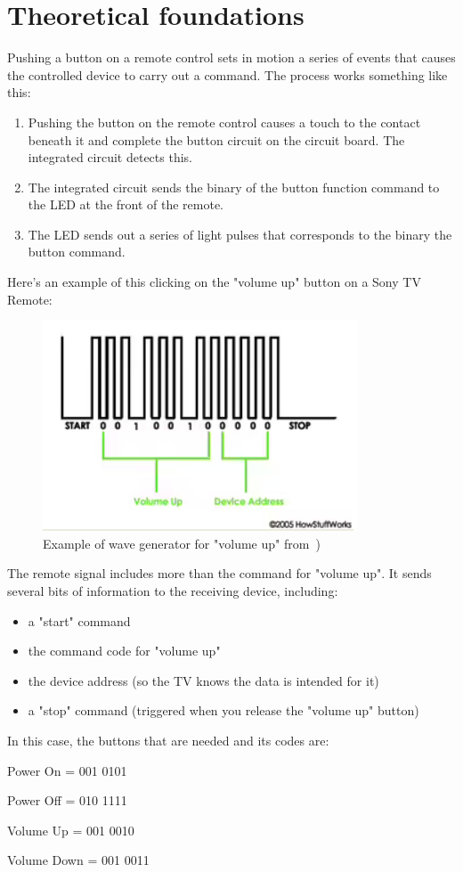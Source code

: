 \section{Theoretical foundations}
\label{sec:theor-found}
Pushing a button on a remote control sets in motion a series of events
that causes the controlled device to carry out a command. The process
works something like this:
\begin{enumerate}
\item 
Pushing the button on the remote control causes a touch to the contact beneath it and complete the button circuit on the circuit board. The integrated circuit detects this.
\item 
The integrated circuit sends the binary of the button function command to the LED at the front of the remote.
\item 
The LED sends out a series of light pulses that corresponds to the binary the button command.
\end{enumerate}
	

Here's an example of this clicking on the "volume up" button on a Sony TV Remote:

\begin{figure}
\centering
    \includegraphics[width=0.5\columnwidth]{./img/buttoncode.png}
  \caption{Example of wave generator for "volume up" from~\cite{btncode})}%
\label{fig:btncode}
\end{figure}

The remote signal includes more than the command for "volume up". It sends
several bits of information to the receiving device, including:
\begin{itemize}
\item a "start" command
\item the command code for "volume up"
\item the device address (so the TV knows the data is intended for it)
\item a "stop" command (triggered when you release the "volume up" button)
\end{itemize}

In this case, the buttons that are needed and its codes are:

Power On = 001 0101

Power Off = 010 1111

Volume Up = 001 0010

Volume Down = 001 0011


